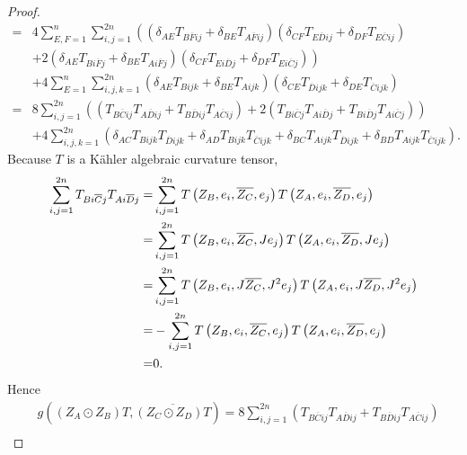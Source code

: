 \documentclass{amsart}
\theoremstyle{definition}
\theoremstyle{remark}
\numberwithin{equation}{section}
\begin{document}
\begin{proof}
\begin{align*}
 =& 4\sum\limits_{E,F=1}^n {\sum\limits_{i,j = 1}^{2n} {\left( {\left( {{\delta _{AE}}{T_{B\overline F ij}} + {\delta _{BE}}{T_{A\overline F ij}}} \right)\left( {{\delta _{CF}}{T_{E\overline D ij}} + {\delta _{DF}}{T_{E\overline C ij}}} \right)} \right.} } \\
&\left. { + 2\left( {{\delta _{AE}}{T_{Bi\overline F j}} + {\delta _{BE}}{T_{Ai\overline F j}}} \right)\left( {{\delta _{CF}}{T_{Ei\overline D j}} + {\delta _{DF}}{T_{Ei\overline C j}}} \right)} \right)\\
 &+ 4\sum\limits_{E=1}^n {\sum\limits_{i,j,k = 1}^{2n} {\left( {{\delta _{AE}}{T_{Bijk}} + {\delta _{BE}}{T_{Aijk}}} \right)} } \left( {{\delta _{CE}}{T_{\overline D ijk}} + {\delta _{DE}}{T_{\overline C ijk}}} \right)\\
 =& 8\sum\limits_{i,j = 1}^{2n} \left( {\left( {{T_{B\overline C ij}}{T_{A\overline D ij}} + {T_{B\overline D ij}}{T_{A\overline C ij}}} \right) + 2\left( {{T_{Bi\overline C j}}{T_{Ai\overline D j}} + {T_{Bi\overline D j}}{T_{Ai\overline C j}}} \right)} \right) \\
 &+ 4\sum\limits_{i,j,k = 1}^{2n} {\left( {{\delta _{AC}}{T_{Bijk}}{T_{\overline D ijk}} + {\delta _{AD}}{T_{Bijk}}{T_{\overline C ijk}} + {\delta _{BC}}{T_{Aijk}}{T_{\overline D ijk}} + {\delta _{BD}}{T_{Aijk}}{T_{\overline C ijk}}} \right)}.
\end{align*}
Because $T$ is a K{\"a}hler algebraic curvature tensor,
\begin{align*}
\sum\limits_{i,j = 1}^{2n} {{T_{Bi\overline C j}}{T_{Ai\overline D j}}}  =& \sum\limits_{i,j = 1}^{2n} {T\left( {{Z_B},{e_i},\overline {{Z_C}} ,{e_j}} \right)T\left( {{Z_A},{e_i},\overline {{Z_D}} ,{e_j}} \right)} \\
=& \sum\limits_{i,j = 1}^{2n} {T\left( {{Z_B},{e_i},\overline {{Z_C}} ,J{e_j}} \right)T\left( {{Z_A},{e_i},\overline {{Z_D}} ,J{e_j}} \right)}  \hfill \\
=& \sum\limits_{i,j = 1}^{2n} {T\left( {{Z_B},{e_i},J\overline {{Z_C}} ,{J^2}{e_j}} \right)T\left( {{Z_A},{e_i},J\overline {{Z_D}} ,{J^2}{e_j}} \right)}  \hfill \\
=&  - \sum\limits_{i,j = 1}^{2n} {T\left( {{Z_B},{e_i},\overline {{Z_C}} ,{e_j}} \right)T\left( {{Z_A},{e_i},\overline {{Z_D}} ,{e_j}} \right)}  \hfill \\
=& 0.
\end{align*}
Hence
\begin{align*}
 &g\left( {\left( {{Z_A} \odot {Z_B}} \right)T,\overline {\left( {{Z_C} \odot {Z_D}} \right)T} } \right)
 = 8\sum\limits_{i,j = 1}^{2n} \left( {{T_{B\overline C ij}}{T_{A\overline D ij}} + {T_{B\overline D ij}}{T_{A\overline C ij}}} \right)   \\

\end{align*}
\end{proof}
\end{document}
